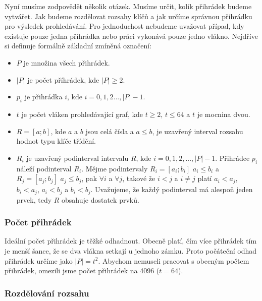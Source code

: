 Nyní musíme zodpovědět několik otázek.
Musíme určit, kolik přihrádek budeme vytvářet.
Jak budeme rozdělovat rozsahy klíčů a jak určíme správnou přihrádku pro výsledek prohledávání.
Pro jednoduchost nebudeme uvažovat případ, kdy existuje pouze jedna příhrádka nebo práci vykonává pouze jedno vlákno.
Nejdříve si definuje formálně základní zmíněná označení:

\begin{itemize}

\item $P$ je množina všech přihrádek.

\item $|P|$ je počet příhrádek, kde $|P|\geq2$.

\item $p_i$ je přihrádka $i$, kde $i=0, 1, 2 ..., |P|-1$.

\item $t$ je počet vláken prohledávající graf, kde $t\geq2$, $t\leq64$ a $t$ je mocnina dvou.

\item $R=[a; b]$, kde $a$ a $b$ jsou celá čísla a $a\leq b$, je uzavřený interval rozsahu hodnot typu klíče třídění.

\item $R_i$ je uzavřený podinterval intervalu $R$, kde $i=0, 1, 2, ..., |P|-1$.
Přihrádce $p_i$ náleží podinterval $R_i$.
Mějme podintervaly $R_i=[a_i; b_i]$ $a_i\leq b_i$ a $R_j=[a_j; b_j]$ $a_j\leq b_j$, pak $\forall i$ a $\forall j$, takové že $i<j$ a $i\neq j$ platí $a_i<a_j$, $b_i<a_j$, $a_i<b_j$ a $b_i<b_j$.
Uvažujeme, že každý podinterval má alespoň jeden prvek, tedy $R$ obsahuje dostatek prvků.

\end{itemize}

\subsubsection{Počet přihrádek}

Ideální počet přihrádek je těžké odhadnout.
Obecně platí, čím více přihrádek tím je menší šance, že se dva vlákna setkají u jednoho zámku.
Proto počáteční odhad přihrádek určíme jako $|P|=t^2$.
Abychom nemuseli pracovat s obecným počtem přihrádek, omezili jsme počet přihrádek na 4096 ($t=64$).

\subsubsection{Rozdělování rozsahu}

